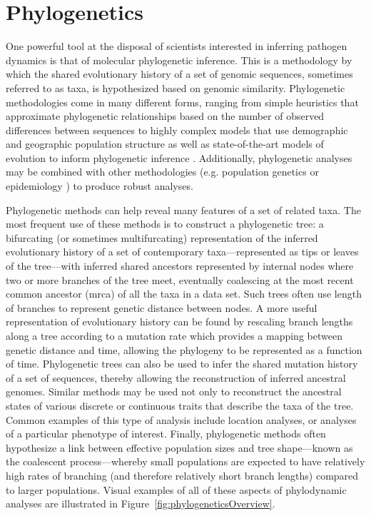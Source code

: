 \section{Phylogenetics}

One powerful tool at the disposal of scientists interested in inferring pathogen dynamics is that of molecular phylogenetic inference.
This is a methodology by which the shared evolutionary history of a set of genomic sequences, sometimes referred to as taxa, is hypothesized based on genomic similarity.
Phylogenetic methodologies come in many different forms, ranging from simple heuristics that approximate phylogenetic relationships based on the number of observed differences between sequences \cite{felsenstein2003inferring} to highly complex models that use demographic and geographic population structure as well as state-of-the-art models of evolution to inform phylogenetic inference \cite{dudas2018mers}.
Additionally, phylogenetic analyses may be combined with other methodologies (e.g. population genetics \cite{felsenstein2003inferring} or epidemiology \cite{Black2020}) to produce robust analyses.


Phylogenetic methods can help reveal many features of a set of related taxa.
The most frequent use of these methods is to construct a phylogenetic tree: a bifurcating (or sometimes multifurcating) representation of the inferred evolutionary history of a set of contemporary taxa---represented as tips or leaves of the tree---with inferred shared ancestors represented by internal nodes where two or more branches of the tree meet, eventually coalescing at the most recent common ancestor (\gls{mrca}) of all the taxa in a data set.
Such trees often use length of branches to represent genetic distance between nodes.
A more useful representation of evolutionary history can be found by rescaling branch lengths along a tree according to a mutation rate which provides a mapping between genetic distance and time, allowing the phylogeny to be represented as a function of time.
Phylogenetic trees can also be used to infer the shared mutation history of a set of sequences, thereby allowing the reconstruction of inferred ancestral genomes.
Similar methods may be used not only to reconstruct the ancestral states of various discrete or continuous traits that describe the taxa of the tree.
Common examples of this type of analysis include location analyses, or analyses of a particular phenotype of interest.
Finally, phylogenetic methods often hypothesize a link between effective population sizes and tree shape---known as the coalescent process---whereby small populations are expected to have relatively high rates of branching (and therefore relatively short branch lengths) compared to larger populations.
Visual examples of all of these aspects of phylodynamic analyses are illustrated in Figure~\ref{fig:phylogeneticsOverview}.

